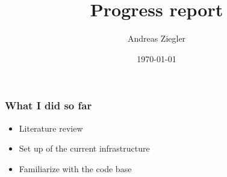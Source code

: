 \documentclass[xcolor={x11names}]{beamer}
\title[Progress report]{Progress report} %
\author{Andreas Ziegler} %
\institute[V4RL] %
{
ETH Zurich \\ %
\medskip
\textit{anziegle@ethz.com} %
}
\date{\today} %
\begin{document}
\begin{frame}
\titlepage %
\end{frame}





\begin{frame}
\frametitle{What I did so far}
\begin{itemize}
  \item Literature review
  \item Set up of the current infrastructure
  \item Familiarize with the code base
\end{itemize}
\end{frame}
\end{document}
